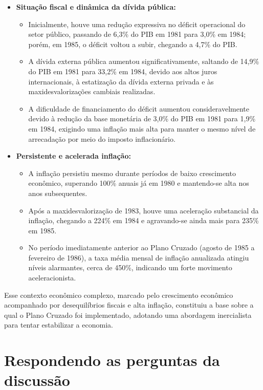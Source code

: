 \documentclass[a4paper,12pt]{article}[abntex2]
\begin{document}
\begin{itemize}
    \item \textbf{Situação fiscal e dinâmica da dívida pública:}
    \begin{itemize}
        \item Inicialmente, houve uma redução expressiva no déficit operacional do setor público, passando de 6,3\% do PIB em 1981 para 3,0\% em 1984; porém, em 1985, o déficit voltou a subir, chegando a 4,7\% do PIB.
        \item A dívida externa pública aumentou significativamente, saltando de 14,9\% do PIB em 1981 para 33,2\% em 1984, devido aos altos juros internacionais, à estatização da dívida externa privada e às maxidesvalorizações cambiais realizadas.
        \item A dificuldade de financiamento do déficit aumentou consideravelmente devido à redução da base monetária de 3,0\% do PIB em 1981 para 1,9\% em 1984, exigindo uma inflação mais alta para manter o mesmo nível de arrecadação por meio do imposto inflacionário.
    \end{itemize}

    \item \textbf{Persistente e acelerada inflação:}
    \begin{itemize}
        \item A inflação persistiu mesmo durante períodos de baixo crescimento econômico, superando 100\% anuais já em 1980 e mantendo-se alta nos anos subsequentes.
        \item Após a maxidesvalorização de 1983, houve uma aceleração substancial da inflação, chegando a 224\% em 1984 e agravando-se ainda mais para 235\% em 1985.
        \item No período imediatamente anterior ao Plano Cruzado (agosto de 1985 a fevereiro de 1986), a taxa média mensal de inflação anualizada atingiu níveis alarmantes, cerca de 450\%, indicando um forte movimento aceleracionista.
    \end{itemize}

\end{itemize}

Esse contexto econômico complexo, marcado pelo crescimento econômico acompanhado por desequilíbrios fiscais e alta inflação, constituiu a base sobre a qual o Plano Cruzado foi implementado, adotando uma abordagem inercialista para tentar estabilizar a economia.

\newpage
\section{\textbf{Respondendo as perguntas da discussão}}
\end{document}

